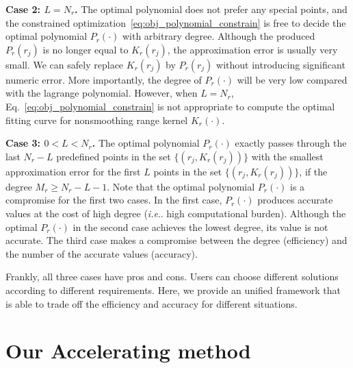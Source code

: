 \documentclass[twocolumn]{el-author}
\makeatletter
\DeclareRobustCommand\onedot{\futurelet\@let@token\@onedot}
\def\@onedot{\ifx\@let@token.\else.\null\fi\xspace}
\def\ie{\emph{i.e}\onedot} \def\Ie{\emph{I.e}\onedot}
\makeatother
\begin{document}
\textbf{Case 2: $ L = N_r$.} The optimal polynomial does not prefer any special points, and the constrained optimization~\eqref{eq:obj_polynomial_constrain} is free to decide the optimal polynomial $P_r(\cdot)$ with arbitrary degree. Although the produced $P_r(r_j)$ is no longer equal to $K_r(r_j)$, the approximation error is usually  very small. We can safely replace $K_r(r_j)$ by $P_r(r_j)$ without introducing significant numeric error. More importantly, the degree of $P_r(\cdot)$ will be very low  compared with the lagrange polynomial. However, when $ L = N_r$, Eq.~\eqref{eq:obj_polynomial_constrain} is not appropriate to compute the optimal fitting curve for nonsmoothing range kernel $K_r(\cdot)$.


\textbf{Case 3: $0 < L < N_r$.} The optimal polynomial $P_r(\cdot)$ exactly passes through the last $N_r-L$ predefined points in the set $\{(r_j, K_r(r_j))\}$ with the smallest approximation error for the first $L$ points in the set $\{(r_j, K_r(r_j))\}$, if the degree $M_r \geq N_r-L-1$. Note that the optimal polynomial $P_r(\cdot)$ is a compromise for the first two cases. In the first case, $P_r(\cdot)$ produces accurate values at the cost of high degree (\ie high computational burden). Although the optimal $P_r(\cdot)$ in the second case achieves the lowest degree, its value is not accurate. The third case makes a compromise between the degree (efficiency) and the number of the accurate values (accuracy).

Frankly, all three cases have pros and cons. Users can choose different solutions according to different requirements. Here, we provide an unified framework that is able to trade off the efficiency and accuracy for different situations.

\section{Our Accelerating method}
\end{document}
